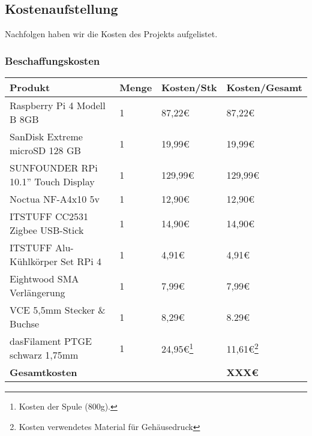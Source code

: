 \subsection{Kostenaufstellung}
Nachfolgen haben wir die Kosten des Projekts aufgelistet.\par
\subsubsection{Beschaffungskosten}
\begin{center}
\begin{tabularx}{\textwidth}{|p{5.6cm}|p{1.2cm}|p{3.5cm}|p{3.5cm}|}
 	\hline
 	\textbf{Produkt} & \textbf{Menge} & \textbf{Kosten/Stk}  & \textbf{Kosten/Gesamt}\\
	\hline
	Raspberry Pi 4 Modell B 8GB & 1 & 87,22\euro{} & 87,22\euro{} \\
	\hline
	SanDisk Extreme microSD 128 GB & 1 & 19,99\euro{} & 19,99\euro{} \\
	\hline
	SUNFOUNDER RPi 10.1'' Touch Display & 1 & 129,99\euro{} & 129,99\euro{} \\
	\hline
	Noctua NF-A4x10 5v & 1 & 12,90\euro{} & 12,90\euro{} \\
	\hline
	ITSTUFF CC2531 Zigbee USB-Stick & 1 & 14,90\euro{} & 14,90\euro{} \\
	\hline
	ITSTUFF Alu-Kühlkörper Set RPi 4 & 1 & 4,91\euro{} & 4,91\euro{} \\
	\hline
	Eightwood SMA Verlängerung & 1 & 7,99\euro{} & 7,99\euro{} \\ 
	\hline
	VCE 5,5mm Stecker \& Buchse & 1 & 8,29\euro{} & 8.29\euro{} \\
	\hline
	dasFilament PTGE schwarz 1,75mm & 1 & 24,95\euro{}\footnote{Kosten der Spule (800g).} & 11,61\euro{}\footnote{Kosten verwendetes Material für Gehäusedruck} \\
	\hline
	\textbf{Gesamtkosten} &  &  & \textbf{XXX\euro{}} \\ %
	\hline
\end{tabularx}
\end{center}

